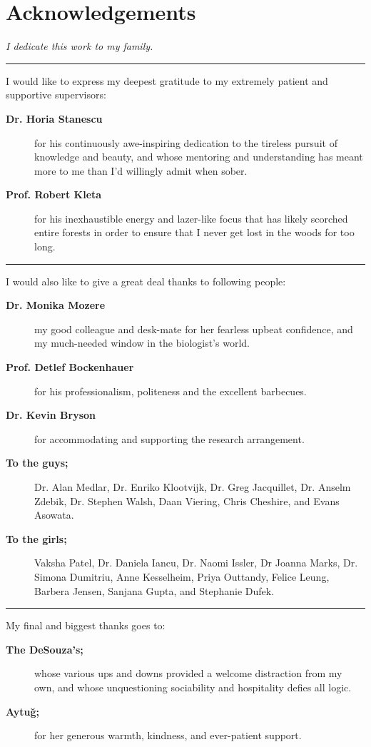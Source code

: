 \chapter*{Acknowledgements}
\vfill
\emph{\large I dedicate this work to my family.}

\vfill\noindent\rule[0.5ex]{\linewidth}{1pt}\vfill
\noindent
I would like to express my deepest gratitude to my extremely patient and supportive supervisors:
\vspace{-4pt}
\begin{spacing}{1.2}
\begin{description}
\item[\bf Dr. Horia Stanescu]{for his continuously awe-inspiring dedication to the tireless pursuit of knowledge and beauty, and whose mentoring and understanding has meant more to me than I'd willingly admit when sober.}
\item[\bf Prof. Robert Kleta]{for his inexhaustible energy and lazer-like focus that has likely scorched entire forests in order to ensure that I never get lost in the woods for too long.}
\end{description}
\end{spacing}

\noindent\rule[0.5ex]{\linewidth}{1pt}

\begin{spacing}{1.2}
\noindent
I would also like to give a great deal thanks to following people:
\vspace{-2pt}
\begin{description}
\item[\bf Dr. Monika Mozere]{my good colleague and desk-mate for her fearless upbeat confidence, and my much-needed window in the biologist's world.}
\item[\bf Prof. Detlef Bockenhauer]{for his professionalism, politeness and the excellent barbecues.}
\item[\bf Dr. Kevin Bryson]{for accommodating and supporting the research arrangement.}
\item[\bf To the guys;]{Dr. Alan Medlar, Dr. Enriko Klootvijk, Dr. Greg Jacquillet, Dr. Anselm Zdebik, Dr. Stephen Walsh, Daan Viering, Chris Cheshire, and Evans Asowata.}
\item[\bf To the girls;]{Vaksha Patel, Dr. Daniela Iancu, Dr. Naomi Issler, Dr Joanna Marks, Dr. Simona Dumitriu, Anne Kesselheim, Priya Outtandy, Felice Leung, Barbera Jensen, Sanjana Gupta, and Stephanie Dufek.}
\end{description}

\vfill\noindent\rule[0.5ex]{\linewidth}{1pt}\vfill
\noindent
My final and biggest thanks goes to:\vspace{-4pt}
\begin{description}
\item[\bf The DeSouza's;]{whose various ups and downs provided a welcome distraction from my own, and whose unquestioning sociability and hospitality defies all logic.} 
\item[\bf Aytu\u{g};]{for her generous warmth, kindness, and ever-patient support.}
\end{description}
\end{spacing}